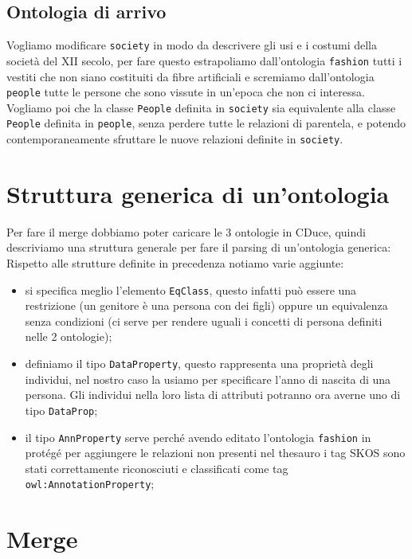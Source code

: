\subsection{Ontologia di arrivo}
Vogliamo modificare \verb|society| in modo da descrivere gli usi e i costumi della società del XII secolo, per fare questo estrapoliamo dall'ontologia \verb|fashion| tutti i vestiti che non siano costituiti da fibre artificiali e scremiamo dall'ontologia \verb|people| tutte le persone che sono vissute in un'epoca che non ci interessa. Vogliamo poi che la classe \verb|People| definita in \verb|society| sia equivalente alla classe \verb|People| definita in \verb|people|, senza perdere tutte le relazioni di parentela, e potendo contemporaneamente sfruttare le nuove relazioni definite in \verb|society|.

\section{Struttura generica di un'ontologia}
Per fare il merge dobbiamo poter caricare le 3 ontologie in CDuce, quindi descriviamo una struttura generale per fare il parsing di un'ontologia generica:
\newpage
Rispetto alle strutture definite in precedenza notiamo varie aggiunte:
\begin{itemize}
	\item si specifica meglio l'elemento \verb|EqClass|, questo infatti può essere una restrizione (un genitore è una persona con dei figli) oppure un equivalenza senza condizioni (ci serve per rendere uguali i concetti di persona definiti nelle 2 ontologie);
	\item definiamo il tipo \verb|DataProperty|, questo rappresenta una proprietà degli individui, nel nostro caso la usiamo per specificare l'anno di nascita di una persona. Gli individui nella loro lista di attributi potranno ora averne uno di tipo \verb|DataProp|;
	\item il tipo \verb|AnnProperty| serve perché avendo editato l'ontologia \verb|fashion| in protégé per aggiungere le relazioni non presenti nel thesauro i tag SKOS sono stati correttamente riconosciuti \cite{OWL&SKOS} e classificati come tag \verb|owl:AnnotationProperty|;
\end{itemize}
\section{Merge}
